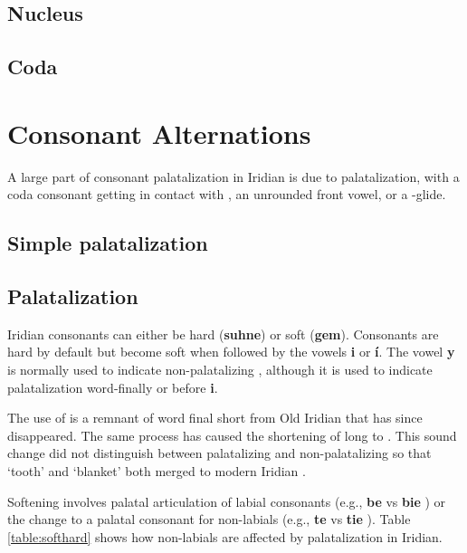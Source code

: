 \subsection{Nucleus}

\subsection{Coda}


\section{Consonant Alternations}

A large part of consonant palatalization in Iridian is due to palatalization, with a coda consonant getting in contact with , an unrounded front vowel, or a -glide.

\subsection{Simple palatalization}

\subsection{Palatalization}
\par Iridian consonants can either be hard (\textbf{suhne}) or soft (\textbf{gem}). Consonants are hard by default but become soft when followed by the vowels \textbf{i} or \textbf{í}. The vowel \textbf{y} is normally used to indicate non-palatalizing , although it is used to indicate palatalization word-finally or before \textbf{i}.

\par The use of  is a remnant of word final short  from Old Iridian that has since disappeared. The same process has caused the shortening of long  to . This sound change did not distinguish between palatalizing and non-palatalizing  so that  `tooth' and  `blanket' both merged to modern Iridian  .

\par Softening involves palatal articulation of labial consonants (e.g., \textbf{be} \textipa{[bE]} vs \textbf{bie} \textipa{[b\sx{j}E]}) or the change to a palatal consonant for non-labials (e.g., \textbf{te} \textipa{[tE]} vs \textbf{tie} \textipa{[cE]}). Table \ref{table:softhard} shows how non-labials are affected by palatalization in Iridian.


